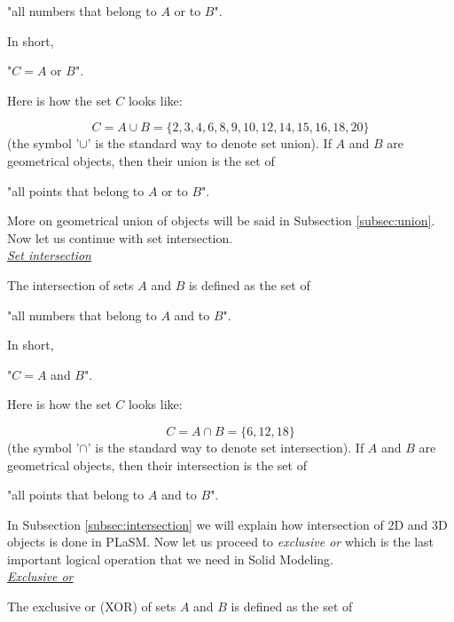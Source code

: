 \centerline{
"all numbers that belong to $A$ {\color{red}or} to $B$".
}
\vspace{4mm}
\noindent
In short,\\

\centerline{
"$C = A$ {\color{red}or} $B$".
}
\vspace{4mm}
\noindent
Here is how the set $C$ looks like:

$$
C = A \cup B = \{2, 3, 4, 6, 8, 9, 10, 12, 14, 15, 16, 18, 20\}
$$
(the symbol '$\cup$' is the standard way to denote set union). If $A$
and $B$ are geometrical objects, then their union is the set of \\

\centerline{
"all points that belong to $A$ {\color{red}or} to $B$".
}
\vspace{4mm}
\noindent
More on geometrical union of objects will be said in 
Subsection \ref{subsec:union}. Now let us continue with 
set intersection.\\

\noindent
\underline{\em Set intersection}

The intersection of sets $A$ and $B$ is defined as the set of \\

\centerline{
"all numbers that belong to $A$ {\color{red}and} to $B$".
}
\vspace{4mm}
\noindent
In short,\\

\centerline{
"$C = A$ {\color{red}and} $B$".
}
\vspace{4mm}
\noindent
Here is how the set $C$ looks like:

$$
C = A \cap B = \{6, 12, 18\}
$$
(the symbol '$\cap$' is the standard way to denote set intersection). If $A$
and $B$ are geometrical objects, then their intersection is the set of \\

\centerline{
"all points that belong to $A$ {\color{red}and} to $B$".
}
\vspace{4mm}
\noindent
In Subsection \ref{subsec:intersection} we will explain how 
intersection of 2D and 3D objects is done in PLaSM. Now let us 
proceed to {\em exclusive or} which is the last important 
logical operation that we need in Solid Modeling.\\

\noindent
\underline{\em Exclusive or}

The exclusive or (XOR) of sets $A$ and $B$ is defined as the set of \\

